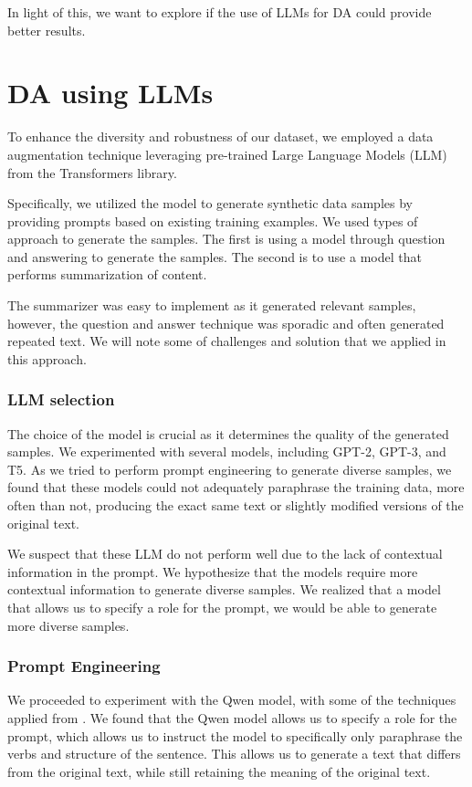 \documentclass{article}
\begin{document}
In light of this, we want to explore if the use of LLMs for DA could provide
better results.

\section{DA using LLMs}

To enhance the diversity and robustness of our dataset, we employed a data
augmentation technique leveraging pre-trained Large Language Models (LLM) from
the Transformers library.

Specifically, we utilized the model to generate synthetic data samples by
providing prompts based on existing training examples. We used types of
approach to generate the samples. The first is using a model through question
and answering to generate the samples. The second is to use a model that
performs summarization of content.

The summarizer was easy to implement as it generated relevant samples, however,
the question and answer technique was sporadic and often generated repeated
text. We will note some of challenges and solution that we applied in this
approach.

\subsubsection{LLM selection}

The choice of the model is crucial as it determines the quality of the
generated samples. We experimented with several models, including GPT-2, GPT-3,
and T5. As we tried to perform prompt engineering to generate diverse samples,
we found that these models could not adequately paraphrase the training data,
more often than not, producing the exact same text or slightly modified
versions of the original text.

We suspect that these LLM do not perform well due to the lack of contextual
information in the prompt. We hypothesize that the models require more
contextual information to generate diverse samples. We realized that a model
that allows us to specify a role for the prompt, we would be able to generate
more diverse samples.

\subsubsection{Prompt Engineering}

We proceeded to experiment with the Qwen model, with some of the techniques
applied from \cite{promptingguide}. We found that the Qwen model allows us to
specify a role for the prompt, which allows us to instruct the model to
specifically only paraphrase the verbs and structure of the sentence. This
allows us to generate a text that differs from the original text, while still
retaining the meaning of the original text.
\end{document}
